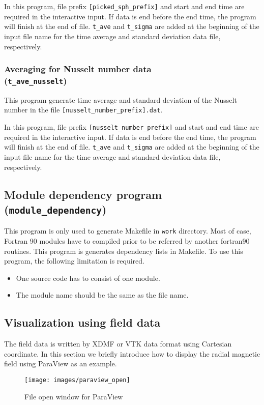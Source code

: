 In this program, file prefix  \verb|[picked_sph_prefix]| and start and end time are required in the interactive input. If data is end before the end time, the program will finish at the end of file. \verb|t_ave| and \verb|t_sigma| are added at the beginning of the input file name for the time average and standard deviation data file, respectively.
%
\subsubsection{Averaging for Nusselt number data \\
 ({\tt t\_ave\_nusselt})}
\label{sec:ave_nusselt}
This program generate time average and standard deviation of the Nusselt number in the file \verb|[nusselt_number_prefix].dat|. 

In this program, file prefix  \verb|[nusselt_number_prefix]| and start and end time are required in the interactive input. If data is end before the end time, the program will finish at the end of file. \verb|t_ave| and \verb|t_sigma| are added at the beginning of the input file name for the time average and standard deviation data file, respectively.
%

\subsection{Module dependency program ({\tt module\_dependency})}
\label{sec:module_dependency}
This program is only used to generate Makefile in {\tt work} directory. Most of case, Fortran 90 modules have to compiled prior to be referred by another fortran90 routines. This program is generates dependency lists in Makefile. To use this program, the following limitation is required.
\begin{itemize}
\item One source code has to consist of one module.
\item The module name should be the same as the file name.
\end{itemize}
%

\subsection{Visualization using field data}
\label{sec:paraview}
The field data is written by XDMF or VTK data format using Cartesian coordinate. In this section we briefly introduce how to display the radial magnetic field using ParaView as an example.
%
\begin{figure}[htbp]
\begin{center}
\texttt{[image: images/paraview\_open]}
\caption{File open window for ParaView}
\label{fig:paraview_load}
\end{center}
\end{figure}
%

